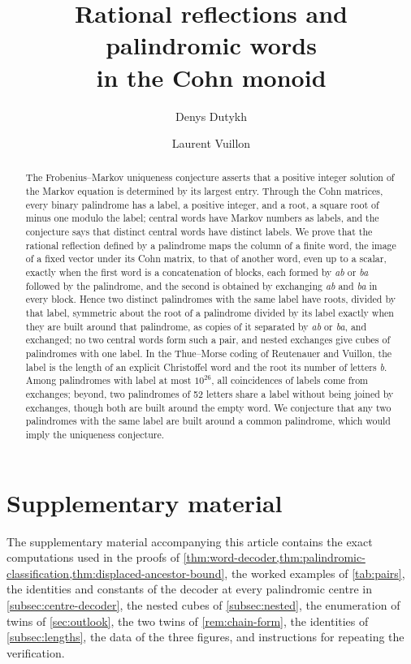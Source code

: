 \documentclass[11pt,reqno]{amsart}
\title[Rational reflections and palindromic words]{Rational reflections and palindromic words\\in the Cohn monoid}
\author{Denys Dutykh}
\author{Laurent Vuillon}
\theoremstyle{definition}
\theoremstyle{definition}
\begin{document}
\begin{abstract}
The Frobenius--Markov uniqueness conjecture asserts that a positive integer solution of the Markov
equation is determined by its largest entry. Through the Cohn matrices, every binary palindrome has
a label, a positive integer, and a root, a square root of minus one modulo the label; central words
have Markov numbers as labels, and the conjecture says that distinct central words have distinct
labels. We prove that the rational reflection defined by a palindrome maps the column of a finite
word, the image of a fixed vector under its Cohn matrix, to that of another word, even up to a
scalar, exactly when the first word is a concatenation of blocks, each formed by \emph{ab} or
\emph{ba} followed by the palindrome, and the second is obtained by exchanging \emph{ab} and
\emph{ba} in every block. Hence two distinct palindromes with the same label have roots, divided by
that label, symmetric about the root of a palindrome divided by its label exactly when they are
built around that palindrome, as copies of it separated by \emph{ab} or \emph{ba}, and exchanged; no
two central words form such a pair, and nested exchanges give cubes of palindromes with one label.
In the Thue--Morse coding of Reutenauer and Vuillon, the label is the length of an explicit
Christoffel word and the root its number of letters \emph{b}. Among palindromes with label at most
$10^{26}$, all coincidences of labels come from exchanges; beyond, two palindromes of 52 letters
share a label without being joined by exchanges, though both are built around the empty word. We
conjecture that any two palindromes with the same label are built around a common palindrome, which
would imply the uniqueness conjecture.
\end{abstract}
\maketitle






\raggedbottom
\section*{Supplementary material}
The supplementary material accompanying this article contains the exact computations used in the proofs
of \cref{thm:word-decoder,thm:palindromic-classification,thm:displaced-ancestor-bound},
the worked examples of \cref{tab:pairs}, the identities and constants of the decoder at every
palindromic centre in \cref{subsec:centre-decoder}, the nested cubes of \cref{subsec:nested}, the
enumeration of twins of \cref{sec:outlook}, the two twins of \cref{rem:chain-form}, the identities
of \cref{subsec:lengths}, the data of the three figures, and instructions for repeating the
verification.
\end{document}

